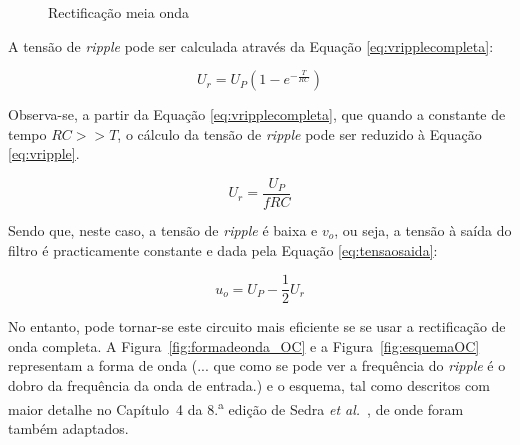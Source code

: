 \begin{figure}[hbtp]
	\centering%
		\centering
		\qquad
		\caption{Rectificação meia onda \cite{sedrasmith}}%
		\label{fig:rectificacaomeiaonda}%
\end{figure}

A tensão de \textit{ripple} pode ser calculada através da Equação \ref{eq:vripplecompleta}:

\begin{equation} \label{eq:vripplecompleta}
	U_{r} = U_{P}(1-e^{-\frac{T}{RC}})
\end{equation}

Observa-se, a partir da Equação \ref{eq:vripplecompleta}, que quando a constante de tempo $RC >> T$, o cálculo da tensão de \textit{ripple} pode ser reduzido à Equação \ref{eq:vripple}.

\begin{equation} \label{eq:vripple}
	U_{r} = \frac{U_{P}}{fRC}
\end{equation}

Sendo que, neste caso, a tensão de \textit{ripple} é baixa e $v_{o}$, ou seja, a tensão à saída do filtro é practicamente constante e dada pela Equação \ref{eq:tensaosaida}:

\begin{equation} \label{eq:tensaosaida}
	u_{o} = U_{P} - \dfrac{1}{2}U_{r}	
\end{equation}

No entanto, pode tornar-se este circuito mais eficiente se se usar a rectificação de onda completa. A Figura~\ref{fig:formadeonda_OC} e a Figura~\ref{fig:esquemaOC} representam a forma de onda (... que como se pode ver a frequência do \textit{ripple} é o dobro da frequência da onda de entrada.) e o esquema, tal como descritos com maior detalhe no Capítulo~4 da 8.\textsuperscript{a} edição de Sedra \textit{et al.}~\cite{sedrasmith}, de onde foram também adaptados. 

